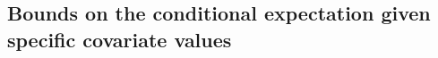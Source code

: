 
\subsection{Bounds on the conditional expectation given specific covariate values} \label{sec:impossibility-of-bounds-for-continuous-data}

% 

